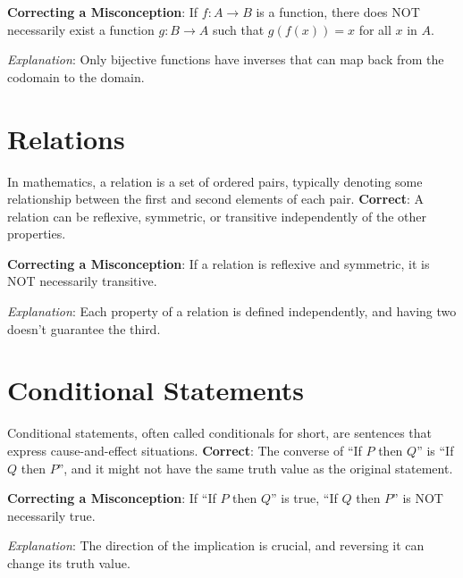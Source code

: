 \documentclass[12pt]{article}
\begin{document}
\textbf{Correcting a Misconception}: If \(f: A \rightarrow B\) is a function, there does NOT necessarily exist a function \(g: B \rightarrow A\) such that \(g(f(x)) = x\) for all \(x\) in \(A\).

\textit{Explanation}: Only bijective functions have inverses that can map back from the codomain to the domain.

\section*{Relations}
In mathematics, a relation is a set of ordered pairs, typically denoting some relationship between the first and second elements of each pair.
\textbf{Correct}: A relation can be reflexive, symmetric, or transitive independently of the other properties.

\textbf{Correcting a Misconception}: If a relation is reflexive and symmetric, it is NOT necessarily transitive.

\textit{Explanation}: Each property of a relation is defined independently, and having two doesn't guarantee the third.

\section*{Conditional Statements}
Conditional statements, often called conditionals for short, are sentences that express cause-and-effect situations.
\textbf{Correct}: The converse of ``If \(P\) then \(Q\)'' is ``If \(Q\) then \(P\)'', and it might not have the same truth value as the original statement.

\textbf{Correcting a Misconception}: If ``If \(P\) then \(Q\)'' is true, ``If \(Q\) then \(P\)'' is NOT necessarily true.

\textit{Explanation}: The direction of the implication is crucial, and reversing it can change its truth value.
\end{document}
